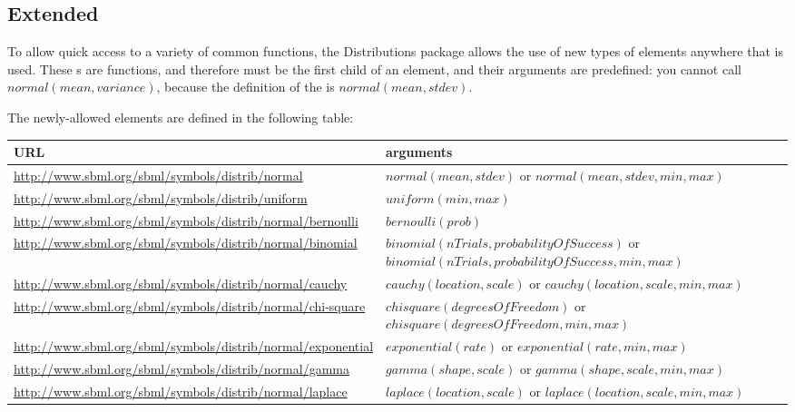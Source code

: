 \documentclass[draftspec]{sbmlpkgspec}
\newcommand{\Math}{\textbf{\class{Math}}\xspace}
\newcommand{\distrib}{Distributions\xspace}
\begin{document}
\subsection{Extended \Math}

To allow quick access to a variety of common functions, the \distrib package allows the use of new types of  elements anywhere that \Math is used.  These s are functions, and therefore must be the first child of an  element, and their arguments are predefined: you cannot call $normal(mean, variance)$, because the definition of the   is $normal(mean, stdev)$.

The newly-allowed  elements are defined in the following table:

\begin{longtabu} to \linewidth {
    X[7,c]
    X[5,l]}
\textbf{URL} & \textbf{arguments} \\ \midrule
\footnotesize{\url{http://www.sbml.org/sbml/symbols/distrib/normal}} &\footnotesize{$normal(mean, stdev)$ or $normal(mean, stdev, min, max)$}
\\ \midrule
\footnotesize{\url{http://www.sbml.org/sbml/symbols/distrib/uniform}} &\footnotesize{$uniform(min, max)$}
\\ \midrule
\footnotesize{\url{http://www.sbml.org/sbml/symbols/distrib/normal/bernoulli}} &\footnotesize{$bernoulli(prob)$}
\\ \midrule
\footnotesize{\url{http://www.sbml.org/sbml/symbols/distrib/normal/binomial}} &\footnotesize{$binomial(nTrials, probabilityOfSuccess)$ or $binomial(nTrials, probabilityOfSuccess, min, max)$}
\\ \midrule
\footnotesize{\url{http://www.sbml.org/sbml/symbols/distrib/normal/cauchy}} &\footnotesize{$cauchy(location, scale)$ or $cauchy(location, scale, min, max)$}
\\ \midrule
\footnotesize{\url{http://www.sbml.org/sbml/symbols/distrib/normal/chi-square}} &\footnotesize{$chisquare(degreesOfFreedom)$ or $chisquare(degreesOfFreedom, min, max)$}
\\ \midrule
\footnotesize{\url{http://www.sbml.org/sbml/symbols/distrib/normal/exponential}} &\footnotesize{$exponential(rate)$ or $exponential(rate, min, max)$}
\\ \midrule
\footnotesize{\url{http://www.sbml.org/sbml/symbols/distrib/normal/gamma}} &\footnotesize{$gamma(shape, scale)$ or $gamma(shape, scale, min, max)$}
\\ \midrule
\footnotesize{\url{http://www.sbml.org/sbml/symbols/distrib/normal/laplace}} &\footnotesize{$laplace(location, scale)$ or $laplace(location, scale, min, max)$}

\end{longtabu}
\end{document}
